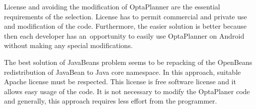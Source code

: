 License and avoiding the modification of OptaPlanner are the essential requirements of the selection. License has to
permit commercial and private use and modification of the code. Furthermore, the easier solution is better because then
each developer has an~opportunity to easily use OptaPlanner on Android without making any special modifications.

The best solution of JavaBeans problem seems to be repacking of the OpenBeans redistribution of JavaBean to Java core
namespace. In this approach, suitable Apache license must be respected. This license is free software license and it
allows easy usage of the code. It is not necessary to modify the OptaPlaner code and generally, this approach requires
less effort from the programmer.

\begin{table}[h!]
\end{table}
